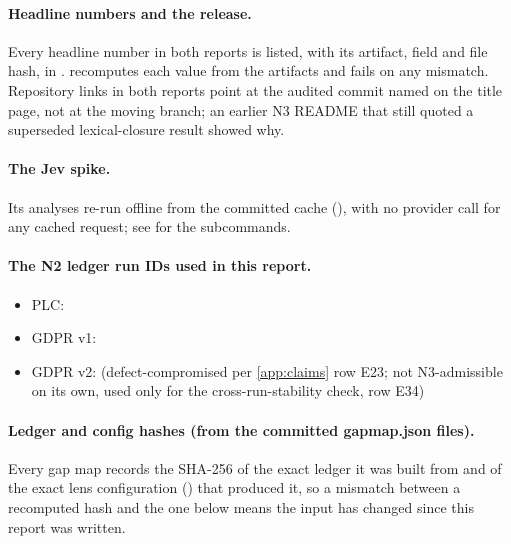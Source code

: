 \paragraph{Headline numbers and the release.} Every headline number in both reports is listed, with
its artifact, field and file hash, in .
 recomputes each value from the artifacts and fails on
any mismatch. Repository links in both reports point at the audited commit named on the title page,
not at the moving  branch; an earlier N3 README that still quoted a superseded
lexical-closure result showed why.

\paragraph{The Jev spike.} Its analyses re-run offline from the committed cache
(), with no provider call for any cached request; see
 for the subcommands.

\paragraph{The N2 ledger run IDs used in this report.}
\begin{itemize}
  \item PLC: 
  \item GDPR v1: 
  \item GDPR v2:  (defect-compromised per
    \cref{app:claims} row E23; not N3-admissible on its own, used only for the cross-run-stability
    check, row E34)
\end{itemize}

\paragraph{Ledger and config hashes (from the committed gapmap.json files).}
Every gap map records the SHA-256 of the exact ledger it was built from and of the exact lens
configuration () that produced it, so a mismatch between a recomputed hash and the
one below means the input has changed since this report was written.

